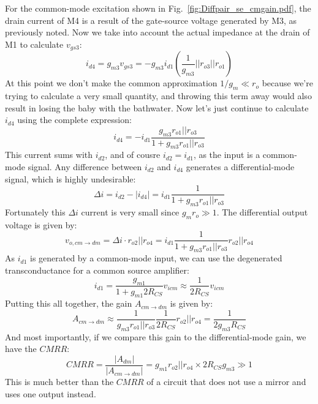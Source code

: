 For the common-mode excitation shown in Fig.~\ref{fig:Diffpair_se_cmgain.pdf}, the drain current of M4 is a result of the gate-source voltage generated by M3, as previously noted.  Now we take into account the actual impedance at the drain of M1 to calculate $v_{gs3}$:
\begin{equation}
	i_{d4} = g_{m3} v_{gs3} = -g_{m3} i_{d1} \left( \frac{1}{g_{m3}} || r_{o3} || r_{o1} \right) 
\end{equation}
%
At this point we don't make the common approximation $1/g_m \ll r_o$ because we're trying to calculate a very small quantity, and throwing this term away would also result in losing the baby with the bathwater.  Now let's just continue to calculate $i_{d4}$ using the complete expression:
%
\begin{equation}
	i_{d4} =  -i_{d1}  \frac{g_{m3} r_{o1} || r_{o3}}{1 + g_{m3} r_{o1} || r_{o3}}
\end{equation}
%
This current sums with $i_{d2}$, and of cousre $i_{d2} = i_{d1}$, as the input is a common-mode signal. Any difference between $i_{d2}$ and $i_{d4}$ generates a differential-mode signal, which is highly undesirable:
%
\begin{equation}
	\Delta i = i_{d2} - | i_{d4} | = i_{d1}  \frac{1}{1 + g_{m3} r_{o1} || r_{o3}}
\end{equation}
%
Fortunately this $\Delta i$ current is very small since $g_m r_o \gg 1$.  The differential output voltage is given by:
%
\begin{equation}
	v_{o,cm\to dm} = \Delta i \cdot r_{o2}||r_{o4} = i_{d1}  \frac{1}{1 + g_{m3} r_{o1} || r_{o3}} r_{o2}||r_{o4}
\end{equation}
%
As $i_{d1}$ is generated by a common-mode input, we can use the degenerated transconductance for a common source amplifier:
%
\begin{equation}
	i_{d1} = \frac{g_{m1}}{1 + g_{m1} 2 R_{CS}} v_{icm} \approx \frac{1}{2 R_{CS}} v_{icm}
\end{equation}
%
Putting this all together, the gain $A_{cm \to dm}$ is given by:
% 
\begin{equation}
	{A_{cm \to dm }} \approx  \frac{1}{g_{m3} r_{o1} || r_{o3}} \frac{1}{2 R_{CS}}  r_{o2}||r_{o4} = \frac{1}{2 g_{m3} R_{CS}} 
\end{equation}
%
And most importantly, if we compare this gain to the differential-mode gain, we have the $CMRR$:
%
\begin{equation}
	CMRR = \frac{{\left| {{A_{dm}}} \right|}}{{\left| {{A_{cm \to dm}}} \right|}} 
	= {g_{m1}} r_{o2} || r_{o4} \times 2 R_{CS} g_{m3}  \gg 1
\end{equation}
%
This is much better than the $CMRR$ of a circuit that does not use a mirror and uses one output instead.




